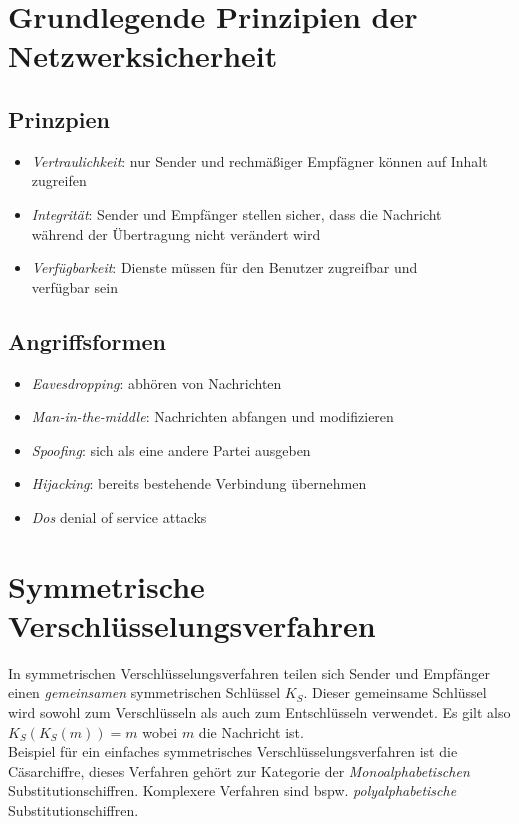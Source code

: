 \section{Grundlegende Prinzipien der Netzwerksicherheit}


\subsection{Prinzpien}
\begin{itemize}
    \item \emph{Vertraulichkeit}: nur Sender und rechmäßiger Empfägner können auf Inhalt zugreifen
    \item \emph{Integrität}: Sender und Empfänger stellen sicher, dass die Nachricht\\ während der Übertragung nicht verändert wird
    \item \emph{Verfügbarkeit}: Dienste müssen für den Benutzer zugreifbar und \\verfügbar sein
\end{itemize}

\subsection{Angriffsformen}
\begin{itemize}
    \item \emph{Eavesdropping}: abhören von Nachrichten
    \item \emph{Man-in-the-middle}: Nachrichten abfangen und modifizieren
    \item \emph{Spoofing}: sich als eine andere Partei ausgeben
    \item \emph{Hijacking}: bereits bestehende Verbindung übernehmen
    \item \emph{Dos} denial of service attacks
\end{itemize}

\section{Symmetrische Verschlüsselungsverfahren}
In symmetrischen Verschlüsselungsverfahren teilen sich Sender und Empfänger einen \emph{gemeinsamen} symmetrischen Schlüssel $K_S$. Dieser gemeinsame Schlüssel wird sowohl zum Verschlüsseln als auch zum Entschlüsseln verwendet. Es gilt also $K_S(K_S(m))=m$ wobei $m$ die Nachricht ist.\\
Beispiel für ein einfaches symmetrisches Verschlüsselungsverfahren ist die Cäsarchiffre, dieses Verfahren gehört zur Kategorie der \emph{Monoalphabetischen} Substitutionschiffren. Komplexere Verfahren sind bspw. \emph{polyalphabetische} Substitutionschiffren.

